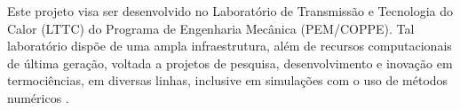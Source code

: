 \bigskip 
Este projeto visa ser desenvolvido no Laboratório de Transmissão e Tecnologia do Calor (LTTC) do Programa de Engenharia Mecânica (PEM/COPPE). 
Tal laboratório dispõe de uma ampla infraestrutura, 
além de recursos computacionais de última geração, 
voltada a projetos de pesquisa, desenvolvimento e inovação
em termociências, em diversas linhas, 
inclusive em simulações com o uso de métodos numéricos \cite{lttccoppe}. 


